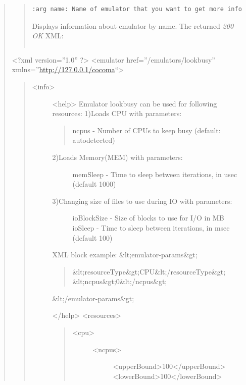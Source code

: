 \documentclass[letterpaper,10pt,english]{sphinxhowto}
\begin{document}
\begin{quote}
\begin{quote}

\begin{Verbatim}[commandchars=\\\{\}]
:arg name: Name of emulator that you want to get more info
\end{Verbatim}

Displays information about emulator by name. The returned \emph{200- OK} XML:

\begin{Verbatim}[commandchars=\\\{\}]
\end{Verbatim}
\end{quote}

\textless{}?xml version=''1.0'' ?\textgreater{}
\textless{}emulator href=''/emulators/lookbusy'' xmlns=''\href{http://127.0.0.1/cocoma}{http://127.0.0.1/cocoma}``\textgreater{}
\begin{quote}
\begin{description}
\item[{\textless{}info\textgreater{}}] \leavevmode
\textless{}help\textgreater{}
Emulator lookbusy can be used for following resources:
1)Loads CPU with parameters:
\begin{quote}

ncpus - Number of CPUs to keep busy (default: autodetected)
\end{quote}
\begin{description}
\item[{2)Loads Memory(MEM) with parameters:}] \leavevmode
memSleep - Time to sleep between iterations, in usec (default 1000)

\item[{3)Changing size of files to use during IO with parameters:}] \leavevmode
ioBlockSize - Size of blocks to use for I/O in MB
ioSleep - Time to sleep between iterations, in msec (default 100)

\end{description}

XML block example:
\&lt;emulator-params\&gt;
\begin{quote}

\&lt;resourceType\&gt;CPU\&lt;/resourceType\&gt;
\&lt;ncpus\&gt;0\&lt;/ncpus\&gt;
\end{quote}

\&lt;/emulator-params\&gt;

\textless{}/help\textgreater{}
\textless{}resources\textgreater{}
\begin{quote}
\begin{description}
\item[{\textless{}cpu\textgreater{}}] \leavevmode\begin{description}
\item[{\textless{}ncpus\textgreater{}}] \leavevmode
\textless{}upperBound\textgreater{}100\textless{}/upperBound\textgreater{}
\textless{}lowerBound\textgreater{}100\textless{}/lowerBound\textgreater{}


\end{description}
\end{description}
\end{quote}
\end{description}
\end{quote}
\end{quote}
\end{document}
